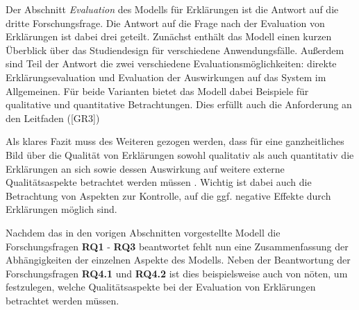 \smallskip

\noindent{}

\smallskip

Der Abschnitt \textit{Evaluation} des Modells für Erklärungen ist die Antwort auf die dritte Forschungsfrage. Die Antwort auf die Frage nach der Evaluation von Erklärungen ist dabei drei geteilt. Zunächst enthält das Modell einen kurzen Überblick über das Studiendesign für verschiedene Anwendungsfälle. Außerdem sind Teil der Antwort die zwei verschiedene Evaluationsmöglichkeiten: direkte Erklärungsevaluation und Evaluation der Auswirkungen auf das System im Allgemeinen. Für beide Varianten bietet das Modell dabei Beispiele für qualitative und quantitative Betrachtungen. Dies erfüllt auch die Anforderung an den Leitfaden ([GR3])

Als klares Fazit muss des Weiteren gezogen werden, dass für eine ganzheitliches Bild über die Qualität von Erklärungen sowohl qualitativ als auch quantitativ die Erklärungen an sich sowie dessen Auswirkung auf weitere externe Qualitätsaspekte betrachtet werden müssen \cite{balog_measuring_2020}. Wichtig ist dabei auch die Betrachtung von Aspekten zur Kontrolle, auf die ggf. negative Effekte durch Erklärungen möglich sind.

\bigskip

Nachdem das in den vorigen Abschnitten vorgestellte Modell die Forschungsfragen \textbf{RQ1} - \textbf{RQ3} beantwortet fehlt nun eine Zusammenfassung der Abhängigkeiten der einzelnen Aspekte des Modells. Neben der Beantwortung der Forschungsfragen \textbf{RQ4.1} und \textbf{RQ4.2} ist dies beispielsweise auch von nöten, um festzulegen, welche Qualitätsaspekte bei der Evaluation von Erklärungen betrachtet werden müssen.